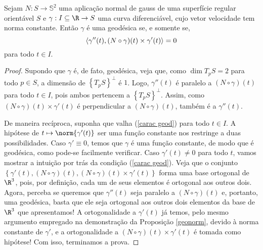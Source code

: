 \begin{prop}
    Sejam \( N : S \to \mathbb{S}^{ 2 } \) uma aplicação normal de gauss de uma superfície regular orientável \( S \) e \( \gamma : I \subseteq \R \to S \) uma curva diferenciável, cujo vetor velocidade tem norma constante.
    Então \( \gamma \) é uma geodésica se, e somente se,
    \begin{equation}
        \langle \gamma'' ( t ), ( N \circ \gamma ) ( t ) \times \gamma' ( t ) \rangle = 0
        \label{carac geod}
    \end{equation}
    para todo \( t \in I \).
\end{prop}
\begin{proof}
    Supondo que \( \gamma \) é, de fato, geodésica, veja que, como \( \dim T_{ p } S = 2 \) para todo \( p \in S \), a dimensão de \( \left\{ T_{ p } S \right\}^{ \perp } \) é \( 1 \).
    Logo, \( \gamma'' ( t ) \) é paralelo a \( ( N \circ \gamma ) ( t ) \) para todo \( t \in I \), pois ambos pertencem a \( \left\{ T_{ p } S \right\}^{ \perp } \).
    Assim, como \( ( N \circ \gamma ) ( t ) \times \gamma' ( t ) \) é perpendicular a \( ( N \circ \gamma ) ( t ) \), também é a \( \gamma'' ( t ) \).

    De maneira recíproca, suponha que valha (\ref{carac geod}) para todo \( t \in I \).
    A hipótese de \( t \mapsto \norm{ \gamma' ( t ) } \) ser uma função constante nos restringe a duas possibilidades.
    Caso \( \gamma' \equiv 0 \), temos que \( \gamma \) é uma função constante, de modo que é geodésica, como pode-se facilmente verificar.
    Caso \( \gamma' ( t ) \neq 0 \) para todo \( t \), vamos mostrar a intuição por trás da condição (\ref{carac geod}).
    Veja que o conjunto \( \left\{ \gamma' ( t ), ( N \circ \gamma ) ( t ), ( N \circ \gamma ) ( t ) \times \gamma' ( t ) \right\} \) forma uma base ortogonal de \( \R^{ 3 } \), pois, por definição, cada um de seus elementos é ortogonal aos outros dois.
    Agora, perceba se queremos que \( \gamma'' ( t ) \) seja paralelo a \( ( N \circ \gamma ) ( t ) \) e, portanto, uma geodésica, basta que ele seja ortogonal aos outros dois elementos da base de \( \R^{ 3 } \) que apresentamos!
    A ortogonalidade a \( \gamma' ( t ) \) já temos, pelo mesmo argumento empregado na demonstração da Proposição \ref{geonorm}, devido à norma constante de \( \gamma' \), e a ortogonalidade a \( ( N \circ \gamma ) ( t ) \times \gamma' ( t ) \) é tomada como hipótese!
    Com isso, terminamos a prova.
\end{proof}

